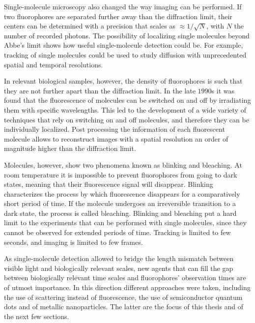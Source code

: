 Single-molecule microscopy also changed the way imaging can be performed. If two
fluorophores are separated further away than the diffraction limit, their
centers can be determined with a precision that scales as $\approx 1/\sqrt{N}$,
with $N$ the number of recorded photons. The possibility of localizing single
molecules beyond Abbe's limit shows how useful single-molecule detection could
be. For example, tracking of single molecules\cite{Schmidt1996} could be used to
study diffusion with unprecedented spatial and temporal resolutions.

In relevant biological samples, however, the density of fluorophores is such
that they are not further apart than the diffraction limit. In the late $1990$s
it was found that the fluorescence of molecules can be switched on and off by
irradiating them with specific wavelengths\cite{Moerner1997}. This led to the
development of a wide variety of techniques that rely on switching on and off
molecules\cite{Betzig2006}, and therefore they can be individually
localized\cite{Dertinger2009}. Post processing the information of each
fluorescent molecule allows to reconstruct images with a spatial resolution an
order of magnitude higher than the diffraction limit\cite{Moerner2007}.

Molecules, however, show two phenomena known as blinking\cite{Orrit2010} and
bleaching\cite{Zondervan2004}. At room temperature it is impossible to prevent
fluorophores from going to dark states, meaning that their fluorescence signal
will disappear. Blinking characterizes the process by which fluorescence
disappears for a comparatively short period of time. If the molecule undergoes
an irreversible transition to a dark state, the process is called bleaching.
Blinking and bleaching put a hard limit to the experiments that can be performed
with single molecules, since they cannot be observed for extended periods of
time. Tracking is limited to few seconds, and imaging is limited to few frames.

As single-molecule detection allowed to bridge the length mismatch between
visible light and biologically relevant scales, new agents that can fill the gap
between biologically relevant time scales and fluorophores' observation times
are of utmost importance. In this direction different approaches were taken,
including the use of scattering instead of
fluorescence\cite{ortega2012interferometric}, the use of semiconductor quantum
dots\cite{alivisatos2005quantum} and of metallic
nanoparticles\cite{huang2009gold}. The latter are the focus of this thesis and
of the next few sections.

